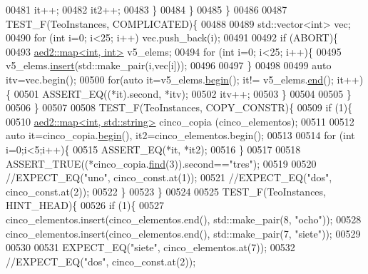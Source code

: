 \begin{DoxyCode}
00481             it++;
00482             it2++;
00483         \}
00484     \}
00485 \}
00486 
00487 TEST\_F(TeoInstances, COMPLICATED)\{
00488 
00489     std::vector<int> vec;
00490     \textcolor{keywordflow}{for} (\textcolor{keywordtype}{int} i=0; i<25; i++) vec.push\_back(i);
00491 
00492     \textcolor{keywordflow}{if} (ABORT)\{
00493         \hyperlink{classaed2_1_1map}{aed2::map<int, int>} v5\_elems;
00494         \textcolor{keywordflow}{for} (\textcolor{keywordtype}{int} i=0; i<25; i++)\{
00495             v5\_elems.\hyperlink{classaed2_1_1map_a6941cde9a79c27f054b5c97a587a1854_a6941cde9a79c27f054b5c97a587a1854}{insert}(std::make\_pair(i,vec[i]));
00496 
00497         \}
00498 
00499         \textcolor{keyword}{auto} itv=vec.begin();
00500         \textcolor{keywordflow}{for}(\textcolor{keyword}{auto} it=v5\_elems.\hyperlink{classaed2_1_1map_a58a95705d54b3dda7f775ce5a22225cb_a58a95705d54b3dda7f775ce5a22225cb}{begin}(); it!= v5\_elems.\hyperlink{classaed2_1_1map_a76023e6a56cb625513e1b5ea028bf983_a76023e6a56cb625513e1b5ea028bf983}{end}(); it++)\{
00501             ASSERT\_EQ((*it).second, *itv);
00502             itv++;
00503         \}
00504 
00505     \}
00506 \}
00507 
00508 TEST\_F(TeoInstances, COPY\_CONSTR)\{
00509         \textcolor{keywordflow}{if} (1)\{
00510         \hyperlink{classaed2_1_1map}{aed2::map<int, std::string>} cinco\_copia (cinco\_elementos);
00511 
00512         \textcolor{keyword}{auto} it=cinco\_copia.\hyperlink{classaed2_1_1map_a58a95705d54b3dda7f775ce5a22225cb_a58a95705d54b3dda7f775ce5a22225cb}{begin}(), it2=cinco\_elementos.begin();
00513 
00514         \textcolor{keywordflow}{for} (\textcolor{keywordtype}{int} i=0;i<5;i++)\{
00515             ASSERT\_EQ(*it, *it2);
00516         \}
00517 
00518         ASSERT\_TRUE((*cinco\_copia.\hyperlink{classaed2_1_1map_afd0fc1a8234888e61e0e615de7e245b8_afd0fc1a8234888e61e0e615de7e245b8}{find}(3)).second==\textcolor{stringliteral}{"tres"});
00519 
00520         \textcolor{comment}{//EXPECT\_EQ("uno", cinco\_const.at(1));}
00521         \textcolor{comment}{//EXPECT\_EQ("dos", cinco\_const.at(2));}
00522     \}
00523 \}
00524 
00525 TEST\_F(TeoInstances, HINT\_HEAD)\{
00526     \textcolor{keywordflow}{if} (1)\{
00527         cinco\_elementos.insert(cinco\_elementos.end(), std::make\_pair(8, \textcolor{stringliteral}{"ocho"}));
00528         cinco\_elementos.insert(cinco\_elementos.end(), std::make\_pair(7, \textcolor{stringliteral}{"siete"}));
00529 
00530 
00531         EXPECT\_EQ(\textcolor{stringliteral}{"siete"}, cinco\_elementos.at(7));
00532         \textcolor{comment}{//EXPECT\_EQ("dos", cinco\_const.at(2));}

\end{DoxyCode}
